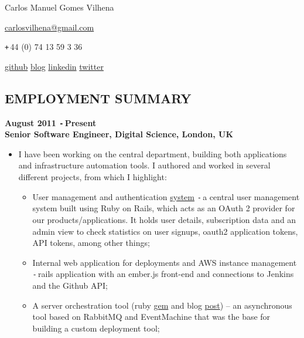 \documentclass{res}
\def\Plus{\texttt{+}\,}
\def\Minus{\texttt{-}\,}
\begin{document}
\thispagestyle{empty}
\centerline{Carlos Manuel Gomes Vilhena}
\vspace{0.1in}
\centerline{\href{mailto:carlosvilhena@gmail.com}{carlosvilhena@gmail.com}}
\centerline{\Plus 44 (0) 74 13 59 3 36}
\centerline{\href{http://github.com/carvil}{github} \hspace{0.5 cm}
\href{http://carvil.github.com/}{blog}  \hspace{0.5 cm}
\href{http://www.linkedin.com/in/carlosvilhena}{linkedin}  \hspace{0.5 cm}
\href{http://www.twitter.com/carvil_}{twitter}
}


\begin{resume}
\vspace{0.1in}


\section{EMPLOYMENT SUMMARY}
\vspace{0.1in}
  {\bf August 2011 \Minus Present}\\
  {\bf Senior Software Engineer, Digital Science, London, UK}
    \begin{itemize} %
      \item[] I have been working on the central department, building both
      applications and infrastructure automation tools. I authored and worked
      in several different projects, from which I highlight:
        \begin{itemize}
        \item User management and authentication \href{https://auth.digital-science.com/}{system} \Minus a central user management
        system built using Ruby on Rails, which acts as an OAuth 2 provider for
        our products/applications. It holds user details, subscription data and
        an admin view to check statistics on user signups, oauth2 application
        tokens, API tokens, among other things;
        \item Internal web application for deployments and AWS instance management \Minus rails application with an ember.js front-end and connections to Jenkins and the Github API;
        \item A server orchestration tool (ruby \href{https://rubygems.org/gems/baton}{gem} and blog \href{http://www.digital-science.com/blog/posts/presenting-baton}{post}) – an asynchronous tool based on RabbitMQ and EventMachine that was the base for building a custom deployment tool;

\end{itemize}
\end{itemize}
\end{resume}
\end{document}
